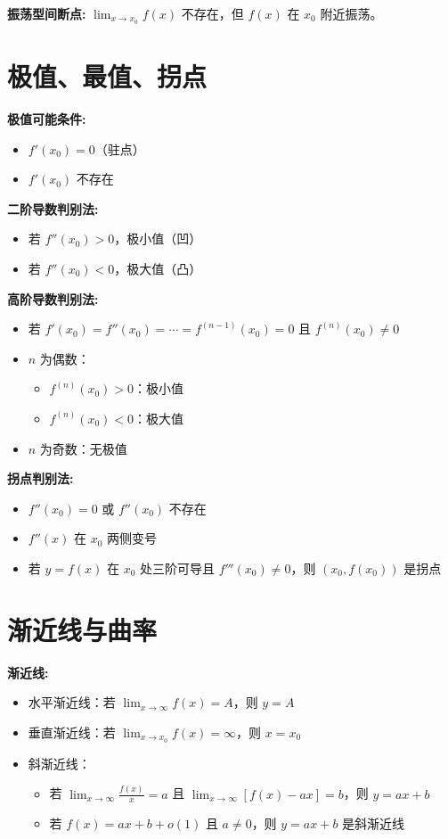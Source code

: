 \documentclass[10pt]{article}
\begin{document}
\begin{multicols*}{2}
\textbf{振荡型间断点:} \(\lim_{x \to x_0} f(x)\) 不存在，但 \(f(x)\) 在 \(x_0\) 附近振荡。


\section*{极值、最值、拐点}
\vspace{-8pt}
\textbf{极值可能条件:}
\begin{itemize}
  \item \(f'(x_0) = 0\)（驻点）
  \item \(f'(x_0)\) 不存在
\end{itemize}

\textbf{二阶导数判别法:}
\begin{itemize}
  \item 若 \(f''(x_0) > 0\)，极小值（凹）
  \item 若 \(f''(x_0) < 0\)，极大值（凸）
\end{itemize}

\textbf{高阶导数判别法:}
\begin{itemize}
  \item 若 \(f'(x_0) = f''(x_0) = \cdots = f^{(n-1)}(x_0) = 0\) 且 \(f^{(n)}(x_0) \neq 0\)
  \item \(n\) 为偶数：
    \begin{itemize}
      \item \(f^{(n)}(x_0) > 0\)：极小值
      \item \(f^{(n)}(x_0) < 0\)：极大值
    \end{itemize}
  \item \(n\) 为奇数：无极值
\end{itemize}

\textbf{拐点判别法:}
\begin{itemize}
  \item \(f''(x_0) = 0\) 或 \(f''(x_0)\) 不存在
  \item \(f''(x)\) 在 \(x_0\) 两侧变号
  \item 若 \(y = f(x)\) 在 \(x_0\) 处三阶可导且 \(f'''(x_0) \neq 0\)，则 \((x_0, f(x_0))\) 是拐点
\end{itemize}

\section*{渐近线与曲率}
\vspace{-8pt}

\textbf{渐近线:}
\begin{itemize}
  \item 水平渐近线：若 \(\lim_{x \to \infty} f(x) = A\)，则 \(y = A\)
  \item 垂直渐近线：若 \(\lim_{x \to x_0} f(x) = \infty\)，则 \(x = x_0\)
  \item 斜渐近线：
    \begin{itemize}
      \item 若 \(\lim_{x \to \infty} \frac{f(x)}{x} = a\) 且 \(\lim_{x \to \infty} [f(x) - ax] = b\)，则 \(y = ax + b\)
      \item 若 \(f(x) = ax + b + o(1)\) 且 \(a \neq 0\)，则 \(y = ax + b\) 是斜渐近线
    \end{itemize}
\end{itemize}


\end{multicols*}
\end{document}
